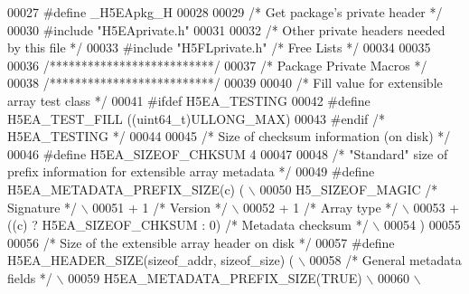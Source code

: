 \begin{DoxyCode}
00027 \textcolor{preprocessor}{#define \_H5EApkg\_H}
00028 
00029 \textcolor{comment}{/* Get package's private header */}
00030 \textcolor{preprocessor}{#include "H5EAprivate.h"}
00031 
00032 \textcolor{comment}{/* Other private headers needed by this file */}
00033 \textcolor{preprocessor}{#include "H5FLprivate.h"}    \textcolor{comment}{/* Free Lists                           */}
00034 
00035 
00036 \textcolor{comment}{/**************************/}
00037 \textcolor{comment}{/* Package Private Macros */}
00038 \textcolor{comment}{/**************************/}
00039 
00040 \textcolor{comment}{/* Fill value for extensible array test class */}
00041 \textcolor{preprocessor}{#ifdef H5EA\_TESTING}
00042 \textcolor{preprocessor}{#define H5EA\_TEST\_FILL          ((uint64\_t)ULLONG\_MAX)}
00043 \textcolor{preprocessor}{#endif }\textcolor{comment}{/* H5EA\_TESTING */}\textcolor{preprocessor}{}
00044 
00045 \textcolor{comment}{/* Size of checksum information (on disk) */}
00046 \textcolor{preprocessor}{#define H5EA\_SIZEOF\_CHKSUM      4}
00047 
00048 \textcolor{comment}{/* "Standard" size of prefix information for extensible array metadata */}
00049 \textcolor{preprocessor}{#define H5EA\_METADATA\_PREFIX\_SIZE(c) (                                        \(\backslash\)}
00050 \textcolor{preprocessor}{    H5\_SIZEOF\_MAGIC   }\textcolor{comment}{/* Signature */}\textcolor{preprocessor}{                                         \(\backslash\)}
00051 \textcolor{preprocessor}{    + 1 }\textcolor{comment}{/* Version */}\textcolor{preprocessor}{                                                         \(\backslash\)}
00052 \textcolor{preprocessor}{    + 1 }\textcolor{comment}{/* Array type */}\textcolor{preprocessor}{                                                      \(\backslash\)}
00053 \textcolor{preprocessor}{    + ((c) ? H5EA\_SIZEOF\_CHKSUM : 0) }\textcolor{comment}{/* Metadata checksum */}\textcolor{preprocessor}{                  \(\backslash\)}
00054 \textcolor{preprocessor}{    )}
00055 
00056 \textcolor{comment}{/* Size of the extensible array header on disk */}
00057 \textcolor{preprocessor}{#define H5EA\_HEADER\_SIZE(sizeof\_addr, sizeof\_size) (                          \(\backslash\)}
00058 \textcolor{preprocessor}{    }\textcolor{comment}{/* General metadata fields */}\textcolor{preprocessor}{                                             \(\backslash\)}
00059 \textcolor{preprocessor}{    H5EA\_METADATA\_PREFIX\_SIZE(TRUE)                                           \(\backslash\)}
00060 \textcolor{preprocessor}{                                                                              \(\backslash\)}

\end{DoxyCode}
